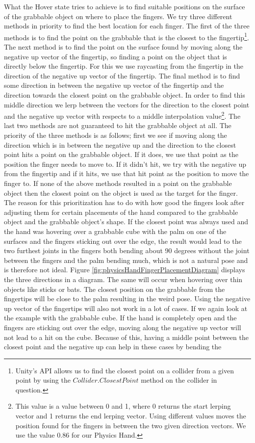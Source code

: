What the Hover state tries to achieve is to find suitable positions on the surface of the grabbable object on where to place the fingers. We try three different methods in priority to find the best location for each finger. The first of the three methods is to find the point on the grabbable that is the closest to the fingertip\footnote{Unity's API allows us to find the closest point on a collider from a given point by using the $Collider.ClosestPoint$ method on the collider in question.}. The next method is to find the point on the surface found by moving along the negative up vector of the fingertip, so finding a point on the object that is directly below the fingertip. For this we use raycasting from the fingertip in the direction of the negative up vector of the fingertip. The final method is to find some direction in between the negative up vector of the fingertip and the direction towards the closest point on the grabbable object. In order to find this middle direction we lerp between the vectors for the direction to the closest point and the negative up vector with respects to a middle interpolation value\footnote{This value is a value between 0 and 1, where 0 returns the start lerping vector and 1 returns the end lerping vector. Using different values moves the position found for the fingers in between the two given direction vectors. We use the value 0.86 for our Physics Hand.}. The last two methods are not guaranteed to hit the grabbable object at all. The priority of the three methods is as follows; first we see if moving along the direction which is in between the negative up and the direction to the closest point hits a point on the grabbable object. If it does, we use that point as the position the finger needs to move to. If it didn't hit, we try with the negative up from the fingertip and if it hits, we use that hit point as the position to move the finger to. If none of the above methods resulted in a point on the grabbable object then the closest point on the object is used as the target for the finger. The reason for this prioritization has to do with how good the fingers look after adjusting them for certain placements of the hand compared to the grabbable object and the grabbable object's shape. If the closest point was always used and the hand was hovering over a grabbable cube with the palm on one of the surfaces and the fingers sticking out over the edge, the result would lead to the two furthest joints in the fingers both bending about 90 degrees without the joint between the fingers and the palm bending much, which is not a natural pose and is therefore not ideal. Figure \ref{fig:physicsHandFingerPlacementDiagram} displays the three directions in a diagram. The same will occur when hovering over thin objects like sticks or bats. The closest position on the grabbable from the fingertips will be close to the palm resulting in the weird pose. Using the negative up vector of the fingertips will also not work in a lot of cases. If we again look at the example with the grabbable cube. If the hand is completely open and the fingers are sticking out over the edge, moving along the negative up vector will not lead to a hit on the cube. Because of this, having a middle point between the closest point and the negative up can help in these cases by bending the 